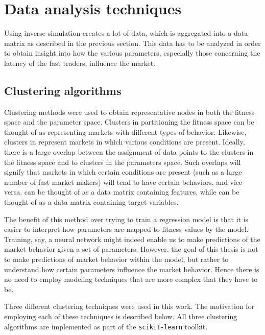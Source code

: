 \section{Data analysis techniques}\label{section:data_analysis_techniques}
Using inverse simulation creates a lot of data, which is aggregated into a data matrix as described in the previous section. This data has to be analyzed in order to obtain insight into how the various parameters, especially those concerning the latency of the fast traders, influence the market.


\subsection{Clustering algorithms}
Clustering methods were used to obtain representative nodes in both the fitness space and the parameter space. Clusters in \datamatrixfit{}{} partitioning the fitness space can be thought of as representing markets with different types of behavior. Likewise, clusters in \datamatrixpar{}{} represent markets in which various conditions are present. Ideally, there is a large overlap between the assignment of data points to the clusters in the fitness space and to clusters in the parameters space. Such overlaps will signify that markets in which certain conditions are present (such as a large number of fast market makers) will tend to have certain behaviors, and vice versa. \datamatrixpar{}{} can be thought of as a data matrix containing features, while \datamatrixfit{}{} can be thought of as a data matrix containing target variables. 

The benefit of this method over trying to train a regression model is that it is easier to interpret how parameters are mapped to fitness values by the model. Training, say, a neural network might indeed enable us to make predictions of the market behavior given a set of parameters. However, the goal of this thesis is not to make predictions of market behavior within the model, but rather to understand how certain parameters influence the market behavior. Hence there is no need to employ modeling techniques that are more complex that they have to be. 

Three different clustering techniques were used in this work. The motivation for employing each of these techniques is described below. All three clustering algorithms are implemented as part of the \texttt{scikit-learn} toolkit\cite{pedregosa2011scikit}.

